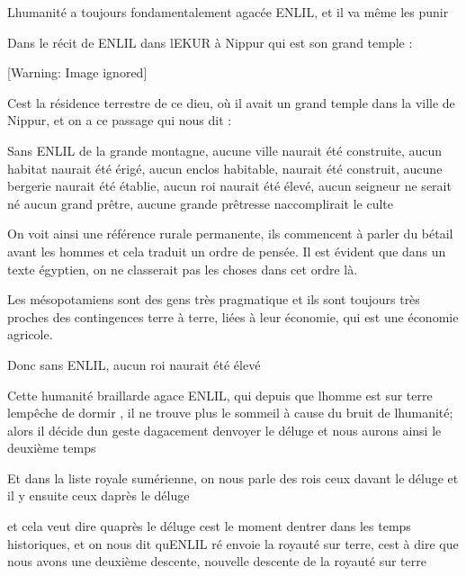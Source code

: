\documentclass{article}
\begin{document}
L{\textquotesingle}humanité a toujours fondamentalement agacée ENLIL, 
et il va même les punir

Dans le récit de ENLIL dans l{\textquotesingle}EKUR à Nippur qui est son
grand temple :

  [Warning: Image ignored] %
 

C{\textquotesingle}est la résidence terrestre de ce dieu, où il avait un
grand temple dans la ville de Nippur, et on a ce passage qui nous dit :

{\textquotedbl}Sans ENLIL de la grande montagne, aucune ville
n{\textquotesingle}aurait été construite, aucun habitat
n{\textquotesingle}aurait été érigé, aucun enclos habitable,
n{\textquotesingle}aurait été construit, aucune bergerie
n{\textquotesingle}aurait été établie, aucun roi
n{\textquotesingle}aurait été élevé, aucun seigneur ne serait  né aucun
grand prêtre, aucune grande prêtresse n{\textquotesingle}accomplirait
le culte {\textquotedbl} 

On voit ainsi une référence rurale permanente, ils commencent à parler
du bétail avant les hommes et cela traduit un ordre de pensée. Il est
évident que dans un texte égyptien, on ne classerait pas les choses
dans cet ordre là.

Les mésopotamiens sont des gens très pragmatique et ils sont toujours
très proches des contingences  terre à terre, liées à leur économie,
qui est une économie agricole.

Donc sans ENLIL, aucun roi n{\textquotesingle}aurait été élevé

Cette humanité braillarde agace ENLIL, qui depuis que
l{\textquotesingle}homme est sur terre l{\textquotesingle}empêche de
dormir , il ne trouve plus le sommeil à cause du bruit de
l{\textquotesingle}humanité; alors il décide d{\textquotesingle}un
geste d{\textquotesingle}agacement d{\textquotesingle}envoyer le déluge
et nous aurons ainsi le deuxième temps

Et dans la liste royale sumérienne, on nous parle des rois
{\textquotedbl} ceux d{\textquotesingle}avant le déluge{\textquotedbl}
et il y ensuite ceux {\textquotedbl} d{\textquotesingle}après le déluge
{\textquotedbl}

et cela veut dire qu{\textquotesingle}après le déluge
c{\textquotesingle}est le moment d{\textquotesingle}entrer dans les
temps historiques, et on nous dit qu{\textquotesingle}ENLIL ré envoie
la royauté sur terre, c{\textquotesingle}est à dire que nous avons une
deuxième descente, nouvelle descente de la royauté sur terre
\end{document}
